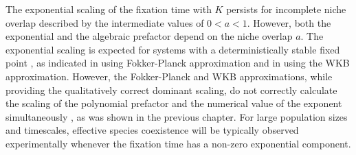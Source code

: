 The exponential scaling of the fixation time with $K$ persists for incomplete niche overlap described by the intermediate values of $0<a<1$. 
However, both the exponential and the algebraic prefactor depend on the niche overlap $a$. 
The exponential scaling is expected for systems with a deterministically stable fixed point \cite{Ovaskainen2010,Assaf2016,Gabel2013,Fisher2014,Doering2005}, as indicated in \cite{Chotibut2015,Dobrinevski2012,Lin2012} using Fokker-Planck approximation and in \cite{Gabel2013} using the WKB approximation. 
However, the Fokker-Planck and WKB approximations, while providing the qualitatively correct dominant scaling, do not correctly calculate the scaling of the polynomial prefactor and the numerical value of the exponent simultaneously \cite{Kessler2007,Ovaskainen2010,Badali2018}, as was shown in the previous chapter.
For large population sizes and timescales, effective species coexistence will be typically observed experimentally whenever the fixation time has a non-zero exponential component. %

\iffalse
\begin{figure}[ht]
	\centering
	\texttt{[image: \{functionalKa9]}}
	\caption{\emph{Right: Niche overlap controls the transition from coexistence to fixation.}  Blue line: $f(a)$ from the ansatz of Equation (\ref{ansatz}) characterizes the exponential dependence of the fixation time on $K$; it  smoothly approaches zero as the niche overlap reaches its Moran line value $a=1$. Green line: $g(a)$ quantifies the scaling of the pre-exponential prefactor $K^{g(a)}$ with $K$. Yellow line: $h(a)$ is the multiplicative constant. Dashed bars represent a 95\% confidence interval. The dots at the extremes $a=0$ and $a=1$ are the expected asymptotic values. 
	} \label{ansatzplot}
\end{figure}%
\fi

